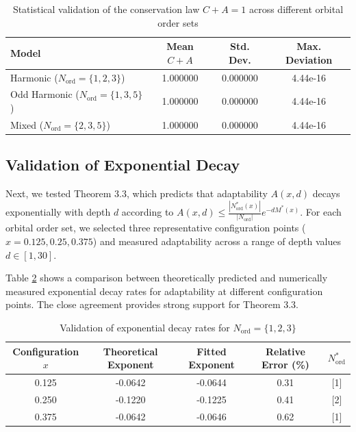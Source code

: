 \documentclass[11pt,a4paper]{article}
\begin{document}
\begin{table}[H]
    \centering
    \begin{tabular}{lccc}
    \toprule
    Model & Mean $C+A$ & Std. Dev. & Max. Deviation \\
    \midrule
    Harmonic ($N_{\text{ord}}=\{1,2,3\}$) & 1.000000 & 0.000000 & 4.44e-16 \\
    Odd Harmonic ($N_{\text{ord}}=\{1,3,5\}$) & 1.000000 & 0.000000 & 4.44e-16 \\
    Mixed ($N_{\text{ord}}=\{2,3,5\}$) & 1.000000 & 0.000000 & 4.44e-16 \\
    \bottomrule
    \end{tabular}
    \caption{Statistical validation of the conservation law $C+A=1$ across different orbital order sets}
    \label{tab:conservation_results}
\end{table}

\subsection{Validation of Exponential Decay}

Next, we tested Theorem 3.3, which predicts that adaptability $A(x,d)$ decays exponentially with depth $d$ according to $A(x,d) \leq \frac{|N_{\text{ord}}^*(x)|}{|N_{\text{ord}}|} e^{-d M^*(x)}$. For each orbital order set, we selected three representative configuration points ($x = 0.125, 0.25, 0.375$) and measured adaptability across a range of depth values $d \in [1,30]$.

Table \ref{tab:decay_validation} shows a comparison between theoretically predicted and numerically measured exponential decay rates for adaptability at different configuration points. The close agreement provides strong support for Theorem 3.3.

\begin{table}[H]
    \centering
    \begin{tabular}{ccccc}
    \toprule
    Configuration $x$ & Theoretical Exponent & Fitted Exponent & Relative Error (\%) & $N_{\text{ord}}^*$ \\
    \midrule
    0.125 & -0.0642 & -0.0644 & 0.31 & [1] \\
    0.250 & -0.1220 & -0.1225 & 0.41 & [2] \\
    0.375 & -0.0642 & -0.0646 & 0.62 & [1] \\
    \bottomrule
    \end{tabular}
    \caption{Validation of exponential decay rates for $N_{\text{ord}}=\{1,2,3\}$}
    \label{tab:decay_validation}
\end{table}
\end{document}
